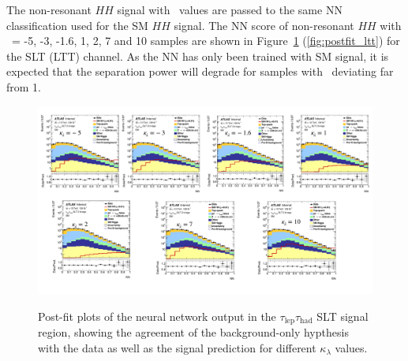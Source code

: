     


The non-resonant $HH$ signal with \kl\ values are passed to the same NN classification used
for the SM $HH$ signal. The NN score of non-resonant $HH$ with \kl\ = -5, -3, -1.6, 1, 2, 7 and 10 
samples are shown in Figure~\ref{fig:postfit_slt} (\ref{fig:postfit_ltt}) for the SLT (LTT) channel.
As the NN has only been trained with SM signal,
it is expected that the separation power will degrade for samples with \kl\ 
deviating far from 1.



\begin{figure}[htbp]
\begin{center}
\includegraphics[width=\textwidth]{DiHiggs/plots/kl_scan/bbtautauSubchannels/bkg_only_postfit_lephad_SLT.pdf}\\
\end{center}
\caption{Post-fit plots of the neural network output in the $\tau_{\text{lep}}\tau_{\text{had}}$ SLT signal region,
showing the agreement of the background-only hypthesis with the data as well as the signal prediction for different $\kappa_\lambda$ values.}
\label{fig:postfit_slt}
\end{figure}

